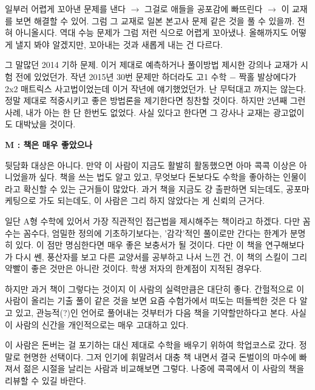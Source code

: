 일부러 어렵게 꼬아낸 문제를 낸다 $\rightarrow$ 그걸로 애들을 공포감에 빠뜨린다 $\rightarrow$ 이 교재를 보면 해결할 수 있어.
그럼 그 교재로 일본 본고사 문제 같은 것을 풀 수 있을까. 전혀 아니올시다.
역대 수능 문제가 그럼 저런 식으로 어렵게 꼬아냈나. 올해까지도 어떻게 낼지 봐야 알겠지만, 꼬아내는 것과 새롭게 내는 건 다르다.
\vspace{5mm}

그 말많던 2014 기하 문제. 이거 제대로 예측하거나 풀이방법 제시한 강의나 교재가 시험 전에 있었던가.
작년 2015년 30번 문제만 하더라도 고1 수학 $-$ 짝홀 발상에다가 2x2 매트릭스 사고법이었는데 이거 작년에 얘기했었던가.
난 무턱대고 까지는 않는다. 정말 제대로 적중시키고 좋은 방법론을 제기한다면 칭찬할 것이다.
하지만 2년째 그런 사례, 내가 아는 한 단 한번도 없었다. 사실 있다고 한다면 그 강사나 교재는 광고없이도 대박났을 것이다.
\vspace{5mm}

\textbf{M : 책은 매우 좋았으나}
\vspace{5mm}

뒷담화 대상은 아니다. 만약 이 사람이 지금도 활발히 활동했으면 아마 콕콕 이상은 아니었을까 싶다.
책을 쓰는 법도 알고 있고, 무엇보다 돈보다도 수학을 좋아하는 인물이라고 확신할 수 있는 근거들이 많았다.
과거 책을 지금도 걍 출판하면 되는데도, 공포마케팅으로 가도 되는데도, 이 사람은 그리 하지 않았다는 게 신뢰의 근거다.
\vspace{5mm}

일단 A형 수학에 있어서 가장 직관적인 접근법을 제시해주는 책이라고 하겠다. 다만 꼼수는 꼼수다,
엄밀한 정의에 기초하기보다는, '감각'적인 풀이로만 간다는 한계가 분명히 있다. 이 점만 명심한다면 매우 좋은 보충서가 될 것이다.
다만 이 책을 연구해보다가 다시 쎈, 풍산자를 보고 다른 교양서를 공부하고 나서 느낀 건, 이 책의 스킬이 그리 약빨이 좋은 것만은 아니란 것이다.
학생 저자의 한계점이 지적된 경우다.
\vspace{5mm}

하지만 과거 책이 그렇다는 것이지 이 사람의 실력만큼은 대단히 좋다. 간헐적으로 이 사람이 올리는 기출 풀이 같은 것을 보면
요즘 수험가에서 떠도는 떠들썩한 것은 다 알고 있고, 관능적(?)인 언어로 풀어내는 것부터가 다음 책을 기약할만하다고 본다.
사실 이 사람의 신간을 개인적으로는 매우 고대하고 있다.
\vspace{5mm}

이 사람은 돈버는 걸 포기하는 대신 제대로 수학을 배우기 위하여 학업코스로 갔다. 정말로 현명한 선택이다.
그저 인기에 휘말려서 대충 책 내면서 결국 돈벌이의 마수에 빠져서 젊은 시절을 날리는 사람과 비교해보면 그렇다.
나중에 콕콕에서 이 사람의 책을 리뷰할 수 있길 바란다.
\vspace{5mm}


